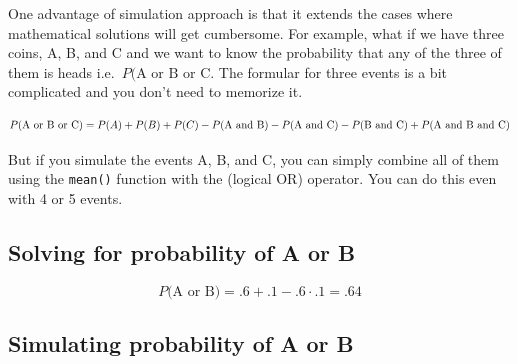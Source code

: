 \documentclass[]{article}
\newenvironment{Shaded}{\begin{snugshade}}{\end{snugshade}}
\newcommand{\CommentTok}[1]{\textcolor[rgb]{0.56,0.35,0.01}{\textit{#1}}}
\newcommand{\DecValTok}[1]{\textcolor[rgb]{0.00,0.00,0.81}{#1}}
\newcommand{\FloatTok}[1]{\textcolor[rgb]{0.00,0.00,0.81}{#1}}
\newcommand{\KeywordTok}[1]{\textcolor[rgb]{0.13,0.29,0.53}{\textbf{#1}}}
\newcommand{\NormalTok}[1]{#1}
\newcommand{\OperatorTok}[1]{\textcolor[rgb]{0.81,0.36,0.00}{\textbf{#1}}}
\newcommand{\StringTok}[1]{\textcolor[rgb]{0.31,0.60,0.02}{#1}}
\begin{document}
One advantage of simulation approach is that it extends the cases where
mathematical solutions will get cumbersome. For example, what if we have
three coins, A, B, and C and we want to know the probability that any of
the three of them is heads i.e.~\(P\textrm{(A or B or C}\). The formular
for three events is a bit complicated and you don't need to memorize it.

\[P\textrm{(A or B or C)} = P(A) + P(B) + P(C) - P\textrm{(A and B)} \\ - P\textrm{(A and C)} - P\textrm{(B and C)} \\+ P\textrm{(A and B and C)} \]

But if you simulate the events A, B, and C, you can simply combine all
of them using the \texttt{mean()} function with the \texttt{\textbar{}}
(logical OR) operator. You can do this even with 4 or 5 events.

\hypertarget{solving-for-probability-of-a-or-b}{%
\subsection{Solving for probability of A or
B}\label{solving-for-probability-of-a-or-b}}

\[P\textrm{(A or B)} = .6 + .1 - .6 \cdot .1 = .64\]

\hypertarget{simulating-probability-of-a-or-b}{%
\subsection{Simulating probability of A or
B}\label{simulating-probability-of-a-or-b}}

\begin{Shaded}
\end{Shaded}
\end{document}

